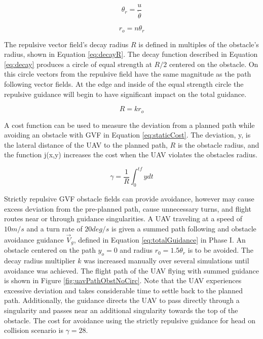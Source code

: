 \documentclass[numbered,pdftex]{ohio-etd}
\begin{document}
\begin{equation}
\label{eq:turning_radius}
\theta_r = \frac{u}{\dot{\theta}}
\end{equation}

\begin{equation}
\label{eq:obstR}
r_o = n \theta_r
\end{equation}

 The repulsive vector field's decay radius $R$ is defined in multiples of the obstacle's radius, shown in Equation \ref{eq:decayR}. The decay function described in Equation \ref{eq:decay} produces a circle of equal strength at $R/2$ centered on the obstacle. On this circle vectors from the repulsive field have the same magnitude as the path following vector fields. At the edge and inside of the equal strength circle the repulsive guidance will begin to have significant impact on the total guidance. 
 
 \begin{equation}
 \label{eq:decayR}
 R = k r_o
 \end{equation}
 
 A cost function can be used to measure the deviation from a planned path while avoiding an obstacle with GVF in Equation \ref{eq:staticCost}. The deviation, y, is the lateral distance of the UAV to the planned path, $R$ is the obstacle radius, and the function j(x,y) increases the cost when the UAV violates the obstacles radius.
 
 \begin{equation}
 \label{eq:staticCost}
 \gamma = \frac{1}{R}\int_{0}^{tf}ydt
 \end{equation}
 
 
 Strictly repulsive GVF obstacle fields can provide avoidance, however may cause excess deviation from the pre-planned path, cause unnecessary turns, and flight routes near or through guidance singularities. A UAV traveling at a speed of $10m/s$ and a turn rate of $20 deg/s$ is given a summed path following and obstacle avoidance guidance $\overrightarrow{V}_g$, defined in Equation \ref{eq:totalGuidance} in Phase I. An obstacle centered on the path $y_o=0$ and radius $r_0 = 1.5\theta_r$ is to be avoided. The decay radius multiplier $k$ was increased manually over several simulations until avoidance was achieved. The flight path of the UAV flying with summed guidance is shown in Figure \ref{fig:uavPathObstNoCirc}. Note that the UAV experiences excessive deviation and takes considerable time to settle back to the planned path. Additionally, the guidance directs the UAV to pass directly through a singularity and passes near an additional singularity towards the top of the obstacle. The cost for avoidance using the strictly repulsive guidance for head on collision scenario is $\gamma=28$.
 
\end{document}

